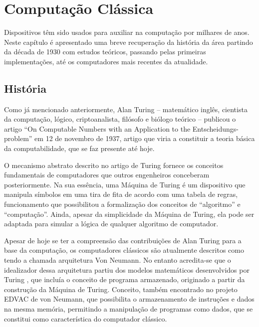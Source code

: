 \section{Computação Clássica} 
\label{classic_comp}

Dispositivos têm sido usados para auxiliar na computação por milhares de anos. Neste capítulo é apresentado uma breve recuperação da história da área partindo da década de 1930 com estudos teóricos, passando pelas primeiras implementações, até os computadores mais recentes da atualidade.

\subsection{História}

Como já mencionado anteriormente, Alan Turing – matemático inglês, cientista da computação, lógico, criptoanalista, filósofo e biólogo teórico – publicou o artigo ``On Computable Numbers with an Application to the Entscheidungs-problem'' \cite{8} em 12 de novembro de 1937, artigo que viria a constituir a teoria básica da computabilidade, que se faz presente até hoje. 

O mecanismo abstrato descrito no artigo de Turing fornece os conceitos fundamentais de computadores que outros engenheiros conceberam posteriormente. Na sua essência, uma Máquina de Turing é um dispositivo que manipula símbolos em uma tira de fita de acordo com uma tabela de regras, funcionamento que possibilitou a formalização dos conceitos de ``algoritmo'' e ``computação''. Ainda, apesar da simplicidade da Máquina de Turing, ela pode ser adaptada para simular a lógica de qualquer algoritmo de computador.

Apesar de hoje se ter a compreensão das contribuições de Alan Turing para a base da computação, os computadores clássicos são atualmente descritos como tendo a chamada arquitetura Von Neumann. No entanto acredita-se que o idealizador dessa arquitetura partiu dos modelos matemáticos desenvolvidos por Turing \cite{10}, que incluía o conceito de programa armazenado, originado a partir da construção da Máquina de Turing. Conceito, também encontrado no projeto EDVAC \cite{9} de von Neumann, que possibilita o armazenamento de instruções e dados na mesma memória, permitindo a manipulação de programas como dados, que se constitui como característica do computador clássico.  

